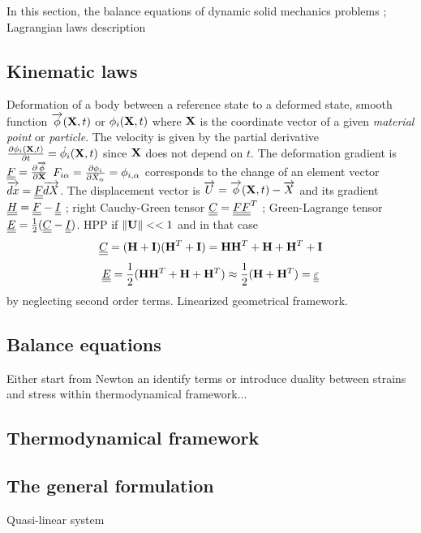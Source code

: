 In this section, the balance equations of dynamic solid mechanics problems ; Lagrangian laws description
\cite{Kluth,Simo}
\subsection{Kinematic laws}
Deformation of a body between a reference state to a deformed state, smooth function ${\overrightarrow{\phi}}(\mathbf{X},t)$ or $\phi_i(\mathbf{X},t)$ where $\mathbf{X}$ is the coordinate vector of a given \textit{material point} or \textit{particle}. The velocity is given by the partial derivative $\frac{\partial \phi_i(\mathbf{X},t)}{\partial t}=\dot{\phi_i}(\mathbf{X},t)$ since $\mathbf{X}$ does not depend on $t$. The deformation gradient is ${\underline{\underline{F}}} = \frac{\partial {\overrightarrow{\phi}}}{\partial \mathbf{X}}$ $F_{i\alpha} = \frac{\partial \phi_i}{\partial X_\alpha}=\phi_{i,\alpha}$ corresponds to the change of an element vector ${\overrightarrow{dx}}={\underline{\underline{F}}}{\overrightarrow{dX}}$. The displacement vector is ${\overrightarrow{U}}= {\overrightarrow{\phi}}(\mathbf{X},t)-{\overrightarrow{X}}$ and its gradient ${\underline{\underline{H}}}={\underline{\underline{F}}}-{\underline{\underline{I}}}$ ; right Cauchy-Green tensor ${\underline{\underline{C}}}={\underline{\underline{F}}}{\underline{\underline{F}}}^T$ ; Green-Lagrange tensor ${\underline{\underline{E}}}=\frac{1}{2}({\underline{\underline{C}}}-{\underline{\underline{I}}})$. HPP if $\left\Vert\mathbf{U}\right\Vert<<1$ and in that case
\begin{equation*}
  {\underline{\underline{C}}}=(\mathbf{H}+\mathbf{I})(\mathbf{H}^T + \mathbf{I}) = \mathbf{H} \mathbf{H}^T +\mathbf{H} + \mathbf{H}^T + \mathbf{I}
\end{equation*}
\begin{equation*}
  {\underline{\underline{E}}}=\frac{1}{2}(\mathbf{H} \mathbf{H}^T +\mathbf{H} + \mathbf{H}^T) \approx \frac{1}{2}(\mathbf{H} + \mathbf{H}^T) = {\underline{\underline{\varepsilon}}} 
\end{equation*}
by neglecting second order terms. Linearized geometrical framework.
\subsection{Balance equations}
Either start from Newton an identify terms or introduce duality between strains and stress within thermodynamical framework...
\subsection{Thermodynamical framework}
\subsection{The general formulation}
Quasi-linear system




